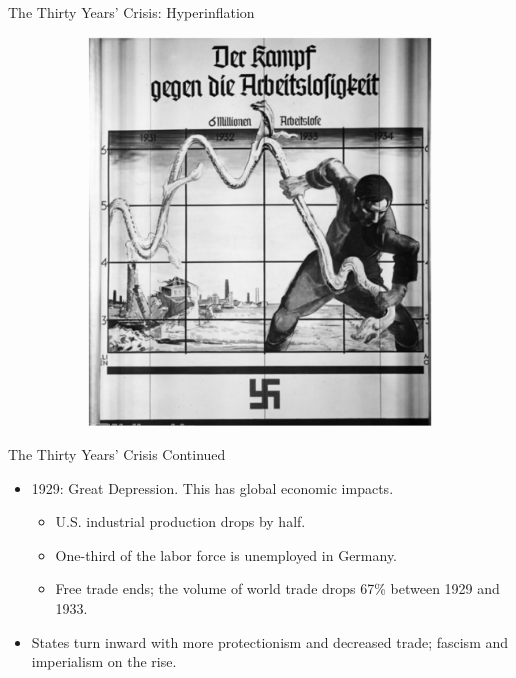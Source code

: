 \documentclass{beamer}
\begin{document}
\begin{frame}{\LARGE The Thirty Years' Crisis: Hyperinflation}
\begin{figure}
\begin{subfigure}{0.49\textwidth}
			\includegraphics[width = \textwidth, height=.9\textheight]{Hitlervsinflation.png}
		\end{subfigure}
	\end{figure}
\end{frame}

\begin{frame}{\LARGE The Thirty Years' Crisis Continued}
	\begin{itemize}
		\item 1929: Great Depression. This has global economic impacts.
		\begin{itemize}
			\item U.S. industrial production drops by half.
			\item One-third of the labor force is unemployed in Germany.
			\item Free trade ends; the volume of world trade drops 67\% between 1929 and 1933.			
		\end{itemize}
		\item States turn inward with more protectionism and decreased trade; fascism and imperialism on the rise.
	\end{itemize}
\end{frame}
\end{document}
